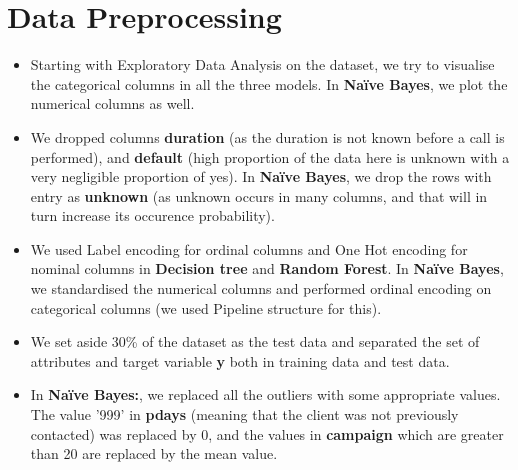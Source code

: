 \documentclass{article}
\begin{document}
\section{Data Preprocessing}
\begin{itemize}
\item Starting with Exploratory Data Analysis on the dataset, we try to visualise the categorical columns in all the three models. In \textbf{Naïve Bayes}, we plot the numerical columns as well.
\item We dropped columns \textbf{duration} (as the duration is not known before a call is performed), and \textbf{default} (high proportion of the data here is unknown with a very negligible proportion of yes). In \textbf{Naïve Bayes}, we drop the rows with entry as \textbf{unknown} (as unknown occurs in many columns, and that will in turn increase its occurence probability).
\item We used Label encoding for ordinal columns and One Hot encoding for nominal columns in \textbf{Decision tree} and \textbf{Random Forest}. In \textbf{Naïve Bayes}, we standardised the numerical columns and performed ordinal encoding on categorical columns (we used Pipeline structure for this). 
\item We set aside 30\% of the dataset as the test data and separated the set of attributes and target variable \textbf{y} both in training data and test data.
\item In \textbf{Naïve Bayes:}, we replaced all the outliers with some appropriate values. The value '999' in \textbf{pdays} (meaning that the client was not previously contacted) was replaced by 0, and the values in \textbf{campaign} which are greater than 20 are replaced by the mean value. 
\end{itemize}
\maketitle
\end{document}

